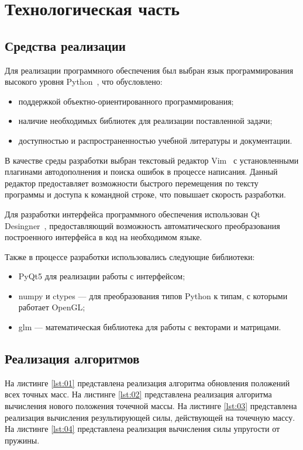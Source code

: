 \chapter{Технологическая часть}

\section{Средства реализации}

Для реализации программного обеспечения был выбран язык программирования
высокого уровня Python~\cite{python}, что обусловлено:
\begin{itemize}
    \item поддержкой объектно-ориентированного программирования;
    \item наличие необходимых библиотек для реализации поставленной задачи;
    \item доступностью и распространенностью учебной литературы и документации.
\end{itemize}

В качестве среды разработки выбран текстовый редактор Vim~\cite{vim} с
установленными плагинами автодополнения и поиска ошибок в процессе
написания. Данный редактор предоставляет возможности быстрого перемещения
по тексту программы и доступа к командной строке, что повышает скорость
разработки.

Для разработки интерфейса программного обеспечения использован Qt
Desingner~\cite{qt}, предоставляющий возможность автоматического преобразования
построенного интерфейса в код на необходимом языке.

Также в процессе разработки использовались следующие библиотеки:
\begin{itemize}
    \item PyQt5 для реализации работы с интерфейсом;
    \item numpy и ctypes --- для преобразования типов Python к типам, с которыми
        работает OpenGL;
    \item glm --- математическая библиотека для работы с векторами и матрицами.
\end{itemize}

\section{Реализация алгоритмов}

На листинге \ref{lst:01} представлена реализация алгоритма обновления
положений всех точных масс. На листинге \ref{lst:02} представлена
реализация алгоритма вычисления нового положения точечной массы. На
листинге \ref{lst:03} представлена реализация вычисления результирующей силы,
действующей на точечную массу. На листинге \ref{lst:04} представлена
реализация вычисления силы упругости от пружины.

